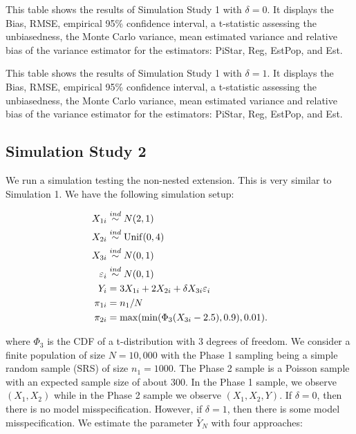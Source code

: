 \documentclass[12pt]{article}
\begin{document}
\begin{table}[ht!]
  \centering
  
\caption{This table shows the results of Simulation Study 1 with $\delta = 0$.
  It displays the Bias, RMSE, empirical 95\% confidence interval, a t-statistic
  assessing the unbiasedness, the Monte Carlo variance, mean estimated variance
  and relative bias of the variance estimator for the estimators: PiStar, Reg,
  EstPop, and Est.}
\label{tab:tpdc0-mean}
\end{table}

\begin{table}[ht!]
  \centering
  
\caption{This table shows the results of Simulation Study 1 with $\delta = 1$.
  It displays the Bias, RMSE, empirical 95\% confidence interval, a t-statistic
  assessing the unbiasedness, the Monte Carlo variance, mean estimated variance
  and relative bias of the variance estimator for the estimators: PiStar, Reg,
  EstPop, and Est.}
\label{tab:tpdc1-mean}
\end{table}

\subsection{Simulation Study 2}

We run a simulation testing the non-nested extension. This is very similar to
Simulation 1. We have the following simulation setup:

$$
\begin{aligned}
X_{1i} &\stackrel{ind}{\sim} N(2, 1) \\
X_{2i} &\stackrel{ind}{\sim} \rm{Unif}(0, 4) \\
X_{3i} &\stackrel{ind}{\sim} N(0, 1) \\
\varepsilon_i &\stackrel{ind}{\sim} N(0, 1) \\
Y_{i} &= 3 X_{1i} + 2 X_{2i} + \delta X_{3i} \varepsilon_i \\
\pi_{1i} &= n_1 / N \\
\pi_{2i} &= \max(\min(\Phi_3(X_{3i} - 2.5), 0.9), 0.01).
\end{aligned}
$$

where $\Phi_3$ is the CDF of a t-distribution with 3 degrees of freedom.
We consider a finite population of size $N = 10,000$ with the Phase 1 
sampling being a simple random sample (SRS) of size $n_1 = 1000$. The Phase 2
sample is a Poisson sample with an expected sample size of about 300.
In the Phase 1 sample, we observe 
$(X_1, X_2)$ while in the Phase 2 sample we observe $(X_1, X_2, Y)$. 
If $\delta = 0$, then there is no model misspecification. However, if $\delta =
1$, then there is some model misspecification. We estimate
the parameter $\bar Y_N$ with four approaches:
\end{document}
